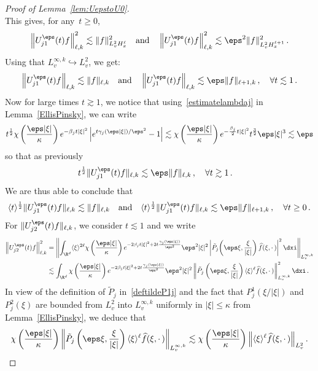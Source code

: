 \begin{proof}[Proof of Lemma~\ref{lem:UepstoU0}]
\begin{equation}
\end{equation}
This gives, for any~$t\geq 0$,
\[
\left\|U^\eps_{j1}(t)f\right\|_{\ell,k} ^2\lesssim \|f\|_{L^2_v H^{\ell}_x }^2 \quad \text{and} \quad \left\|U^\eps_{j1}(t)f \right\|_{\ell,k} ^2 \lesssim \eps^2 \|f\|^2_{L^2_vH^{\ell+1}_x} \,.
\]
Using that $ L^{\infty,k}_v \hookrightarrow L^2_v$, we get:
\[
\left\|U^\eps_{j1}(t)f\right\|_{\ell,k} \lesssim \|f\|_{\ell,k} \quad \text{and} \quad \left\|U^\eps_{j1}(t)f\right\|_{\ell,k} \lesssim \eps \|f\|_{\ell+1,k} \,, \quad \forall t \lesssim 1\,.
\]
Now for large times $t \gtrsim 1$, we notice that using~\eqref{estimatelambdaj} in Lemma~\ref{EllisPinsky}, we can write
\[
t^{\frac12}\chi\left(\frac{\eps|\xi|}\kappa\right) e^{- \beta_j t |\xi|^2} \left|e^{t \gamma_j(\eps|\xi|)/\eps^2}-1 \right| \lesssim \chi\left (\frac{\eps|\xi|}\kappa\right) e^{- \frac{\beta_j }2 t |\xi|^2} t^{\frac 32} \eps |\xi|^3 \lesssim \eps
\]
so that as previously
\begin{align*}
t^{\frac 12} \|U^\eps_{j1}(t)f\|_{\ell,k} &\lesssim \eps \|f\|_{\ell,k}\,, \quad \forall t \gtrsim 1\,.
\end{align*}
We are thus able to conclude that
\[
\langle t \rangle^{\frac 12} \|U^\eps_{j1}(t)f\|_{{\ell,k}} \lesssim \|f\|_{\ell,k} \quad \text{and} \quad \langle t \rangle^\frac12 \|U^\eps_{j1}(t)f\|_{\ell,k} \lesssim \eps \|f\|_{\ell+1,k}\,,\quad \forall t \ge 0 \,.
\]
For $\|U^\eps_{j2}(t)f\|_{\ell,k}$, we consider $t \lesssim 1$ and we write
\begin{align*}
\left\|U^\eps_{j2}(t)f\right\|_{\ell,k}^2
&=\left\| \int_{\R^d} \langle \xi \rangle^{2\ell} \chi \left(\frac{\eps|\xi|}\kappa\right) e^{- 2\beta_j t |\xi|^2+ 2t \frac{\gamma_j(\eps|\xi|)}{\eps^2}} \eps^2 |\xi|^2 \left|\tilde P_{j}\!\left(\eps \xi,\frac{\xi}{|\xi|}\right)\widehat{f}(\xi,\cdot\,)\right|^2 \dxi\right\|_{L^{\infty,k}_v} \\
&\lesssim \int_{\R^d} \chi\left(\frac{\eps|\xi|}\kappa\right) e^{- 2\beta_j t |\xi|^2+ 2t \frac{\gamma_j(\eps|\xi|)}{\eps^2}} \eps^2 |\xi|^2 \left\|\tilde P_{j}\left(\eps \xi,\frac{\xi}{|\xi|}\right) \langle \xi \rangle^{\ell} \widehat{f}(\xi,\cdot\,)\right\|_{L^{\infty,k}_v}^2 \dxi \,.
\end{align*}
In view of the definition of $\tilde P_{j}$ in~\eqref{deftildeP1j} and the fact that $P_{j}^1(\xi/|\xi|)$ and $P_{j}^2(\xi)$ are bounded from $L^2_v$ into $L^{\infty,k}_v$ uniformly in $|\xi| \le \kappa$ from Lemma~\ref{EllisPinsky}, we deduce that
\[
\chi\left(\frac{\eps|\xi|}\kappa\right) \left\|\tilde P_{j}\left(\eps \xi,\frac{\xi}{|\xi|}\right) \langle \xi \rangle^{\ell}\widehat{f}(\xi,\cdot\,)\right\|_{L^{\infty,k}_v} \lesssim \chi\left (\frac{\eps|\xi|}\kappa\right) \Big\| \langle \xi \rangle^{\ell}\widehat{f}(\xi,\cdot\,)\Big\|_{L^2_v} \,.
\]
\end{proof}
